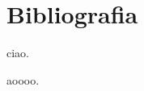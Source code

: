 \section{Bibliografia}
\begin{enumerate}[label={[\arabic*]}]
\item ciao.
\item aoooo.
\end{enumerate}